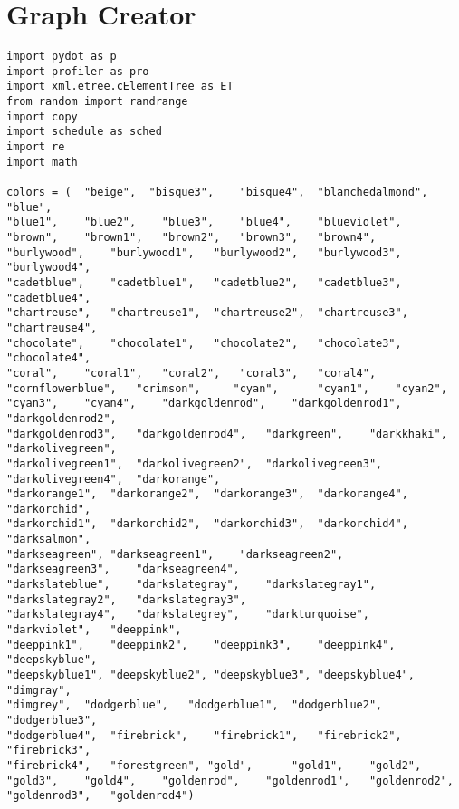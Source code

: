 \documentclass[a4paper,10pt,twoside]{book}
\begin{document}
\section{Graph Creator}
\begin{lstlisting}[language=CCC, caption=pargraph.py]
import pydot as p
import profiler as pro
import xml.etree.cElementTree as ET
from random import randrange
import copy
import schedule as sched
import re
import math

colors = (	"beige",  "bisque3",	"bisque4",	"blanchedalmond",	   "blue",  
"blue1",	"blue2",	"blue3",	"blue4",	"blueviolet",
"brown",	"brown1",	"brown2",   "brown3", 	"brown4",
"burlywood",	"burlywood1",	"burlywood2",	"burlywood3",	"burlywood4",
"cadetblue",	"cadetblue1",	"cadetblue2",	"cadetblue3",	"cadetblue4",
"chartreuse",	"chartreuse1",	"chartreuse2",	"chartreuse3",	"chartreuse4",
"chocolate",	"chocolate1",	"chocolate2",	"chocolate3",	"chocolate4",
"coral",	"coral1",	"coral2",	"coral3",	"coral4",
"cornflowerblue",	"crimson",	   "cyan",   	"cyan1",	"cyan2",
"cyan3",	"cyan4",	"darkgoldenrod",	"darkgoldenrod1",	"darkgoldenrod2",
"darkgoldenrod3",	"darkgoldenrod4",	"darkgreen",	"darkkhaki",	"darkolivegreen",
"darkolivegreen1",	"darkolivegreen2",	"darkolivegreen3",	"darkolivegreen4",	"darkorange",
"darkorange1",	"darkorange2",	"darkorange3",	"darkorange4",	"darkorchid",
"darkorchid1",	"darkorchid2",	"darkorchid3",	"darkorchid4",	"darksalmon",
"darkseagreen",	"darkseagreen1",	"darkseagreen2",	"darkseagreen3",	"darkseagreen4",
"darkslateblue",	"darkslategray",	"darkslategray1",	"darkslategray2",	"darkslategray3",
"darkslategray4",	"darkslategrey",	"darkturquoise",	"darkviolet",	"deeppink",
"deeppink1",	"deeppink2",	"deeppink3",	"deeppink4",	"deepskyblue",
"deepskyblue1",	"deepskyblue2",	"deepskyblue3",	"deepskyblue4",	"dimgray",
"dimgrey",	"dodgerblue",	"dodgerblue1",	"dodgerblue2",	"dodgerblue3",
"dodgerblue4",	"firebrick",	"firebrick1",	"firebrick2",	"firebrick3",
"firebrick4",	"forestgreen", "gold",   	"gold1",	"gold2",	
"gold3",	"gold4",    "goldenrod",	"goldenrod1",	"goldenrod2",	"goldenrod3",	"goldenrod4")


\end{lstlisting}
\end{document}
